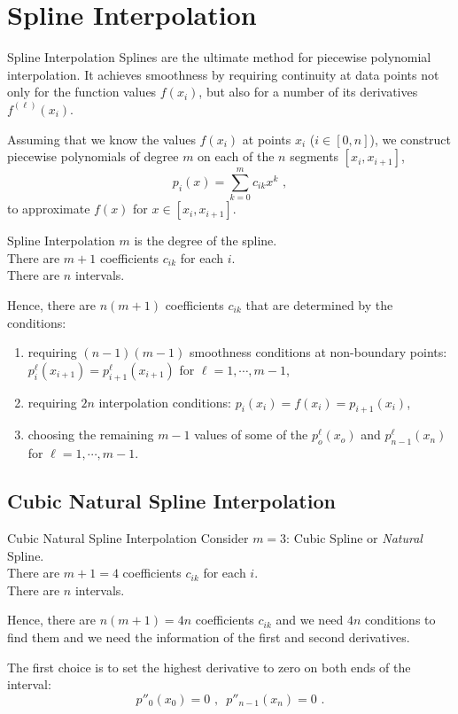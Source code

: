 \documentclass[11pt]{beamer}
\begin{document}
\section{Spline Interpolation}
\begin{frame}[fragile]{Spline Interpolation}
Splines are the ultimate method for piecewise polynomial interpolation.
It achieves smoothness by requiring continuity at
data points not only for the function values $f(x_i)$, but also for a
number of its derivatives $f^{(\ell)} (x_i)$. 
\bigskip
\pause

Assuming that we know the
values $f(x_i)$ at points $x_i$ ($i \in [0,n]$), we construct
piecewise polynomials of degree $m$ on each of the $n$ segments $[x_i,x_{i+1}]$,
\begin{equation}
p_i(x) = \sum_{k=0}^m c_{ik} x^k\,\,,
\end{equation}
to approximate $f(x)$ for $x \in [x_i,x_{i+1}]$. 
\end{frame}

\begin{frame}[fragile]{Spline Interpolation}
$m$ is the degree of the spline.\\
There are $m+1$ coefficients $c_{ik}$ for each $i$.\\
There are $n$ intervals.\\
\pause
\bigskip

Hence, there are $n (m+1)$ coefficients $c_{ik}$
that are determined by the conditions:
\begin{enumerate}
\item requiring $(n-1)(m-1)$ smoothness conditions at non-boundary
  points: $p_i^{\ell}(x_{i+1}) = p^{\ell}_{i+1}(x_{i+1})$ for $\ell=1,\cdots,m-1$,
\item requiring $2n$ interpolation conditions: $p_i(x_i) = f(x_i) =
  p_{i+1}(x_i)$,
\item choosing the remaining $m-1$ values of some of the $p_o^{\ell}(x_o)$
  and $p_{n-1}^{\ell}(x_n)$ for $\ell=1,\cdots,m-1$.
\end{enumerate}
\end{frame}

\subsection{Cubic Natural Spline Interpolation}
\begin{frame}[fragile]{Cubic Natural Spline Interpolation}
Consider $m=3$: Cubic Spline or \textit{Natural} Spline.\\ 
There are $m+1=4$ coefficients $c_{ik}$ for each $i$.\\
There are $n$ intervals.
\pause
\bigskip

Hence, there are $n (m+1)= 4n$ coefficients $c_{ik}$ and we need $4n$ conditions to find them and we need the information of the first and second derivatives.
\pause
\bigskip

The first choice is to set the highest derivative to zero on both ends of the interval:
\begin{equation}
p''_0(x_0) = 0\,\,,\,\,\,p''_{n-1} (x_n) = 0\,\,.
\end{equation}
\end{frame}
\end{document}
